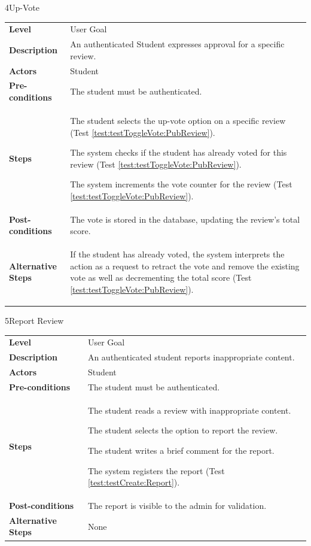 \begin{usecasetable}{4}{Up-Vote}
	\begin{tabularx}{\textwidth}{@{} l|X @{}}
		\textbf{Level} & User Goal \\
		\textbf{Description} & An authenticated Student expresses approval for a specific review. \\
		\textbf{Actors} & Student \\
		\textbf{Pre-conditions} & The student must be authenticated. \\
		\textbf{Steps} &
		\begin{tabenum}
			\item The student selects the up-vote option on a specific review (Test \ref{test:testToggleVote:PubReview}).
			\item The system checks if the student has already voted for this review (Test \ref{test:testToggleVote:PubReview}).
			\item The system increments the vote counter for the review (Test \ref{test:testToggleVote:PubReview}).
		\end{tabenum} \\
		\textbf{Post-conditions} & The vote is stored in the database, updating the review's total score. \\
		\textbf{Alternative Steps} & \begin{tabitem}
			\item[3a.] If the student has already voted, the system interprets the action as a request to retract the vote and remove the existing vote as well as decrementing the total score (Test \ref{test:testToggleVote:PubReview}).
		\end{tabitem}
	\end{tabularx}
\end{usecasetable}

\vspace{2em}
\begin{usecasetable}{5}{Report Review}
	\begin{tabularx}{\textwidth}{@{} l|X @{}}
		\textbf{Level} & User Goal \\
		\textbf{Description} & An authenticated student reports inappropriate content. \\
		\textbf{Actors} & Student \\
		\textbf{Pre-conditions} & The student must be authenticated. \\
		\textbf{Steps} &
		\begin{tabenum}
			\item The student reads a review with inappropriate content.
			\item The student selects the option to report the review.
			\item The student writes a brief comment for the report. 
			\item The system registers the report (Test \ref{test:testCreate:Report}).
		\end{tabenum} \\
		\textbf{Post-conditions} & The report is visible to the admin for validation. \\
		\textbf{Alternative Steps} & None
	\end{tabularx}
\end{usecasetable}


